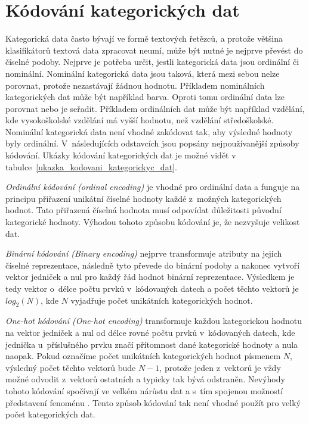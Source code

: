 \section{Kódování kategorických dat}
\label{kodovani_kategorickych_dat}
Kategorická data často bývají ve formě textových řetězců, a protože většina klasifikátorů textová data zpracovat neumí, může být nutné je nejprve převést do číselné podoby. Nejprve je potřeba určit, jestli kategorická data jsou ordinální či nominální. Nominální kategorická data jsou taková, která mezi sebou nelze porovnat, protože nezastávají žádnou hodnotu. Příkladem nominálních kategorických dat může být například barva. Oproti tomu ordinální data lze porovnat nebo je seřadit. Příkladem ordinálních dat může být například vzdělání, kde vysokoškolské vzdělání má vyšší hodnotu, než vzdělání středoškolské. Nominální kategorická data není vhodné zakódovat tak, aby výsledné hodnoty byly ordinální. V~následujících odstavcích jsou popsány nejpoužívanější způsoby kódování. Ukázky kódování kategorických dat je možné vidět v tabulce~\ref{ukazka_kodovani_kategorickyc_dat}.\cite{cat_var_enc1}

\textit{Ordinální kódování (ordinal encoding)} je vhodné pro ordinální data a funguje na principu přiřazení unikátní číselné hodnoty každé z~možných kategorických hodnot. Tato přiřazená číselná hodnota musí odpovídat důležitosti původní kategorické hodnoty. Výhodou tohoto způsobu kódování je, že nezvyšuje velikost dat.\cite{cat_var_enc1}

\textit{Binární kódování (Binary encoding)} nejprve transformuje atributy na jejich číselné reprezentace, následně tyto převede do binární podoby a nakonec vytvoří vektor jedniček a nul pro každý řád hodnot binární reprezentace. Výsledkem je tedy vektor o~délce počtu prvků v~kódovaných datech a počet těchto vektorů je $log_2(N)$, kde $N$ vyjadřuje počet unikátních kategorických hodnot.\cite{cat_var_enc2}

\textit{One-hot kódování (One-hot encoding)} transformuje každou kategorickou hodnotu na vektor jedniček a nul od délce rovné počtu prvků v~kódovaných datech, kde jednička u~příslušného prvku značí přítomnost dané kategorické hodnoty a nula naopak. Pokud označíme počet unikátních kategorických hodnot písmenem $N$, výsledný počet těchto vektorů bude $N-1$, protože jeden z~vektorů je vždy možné odvodit z~vektorů ostatních a typicky tak bývá odstraněn. Nevýhody tohoto kódování spočívají ve velkém nárůstu dat a s~tím spojenou možností představení fenoménu . Tento způsob kódování tak není vhodné použít pro velký počet kategorických dat.\cite{cat_var_enc1}\cite{cat_var_enc2}


